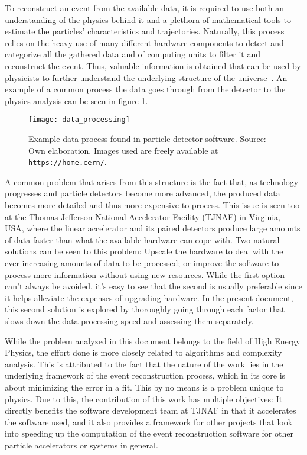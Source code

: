 To reconstruct an event from the available data, it is required to use both an understanding of the physics behind it and a plethora of mathematical tools to estimate the particles' characteristics and trajectories.
Naturally, this process relies on the heavy use of many different hardware components to detect and categorize all the gathered data and of computing units to filter it and reconstruct the event.
Thus, valuable information is obtained that can be used by physicists to further understand the underlying structure of the universe~\cite{sirunyan2017particle}.
An example of a common process the data goes through from the detector to the physics analysis can be seen in figure \ref{fig:data_processing}.

    \begin{figure}[ht]
        \centering
        \texttt{[image: data\_processing]}
        \caption{\label{fig:data_processing} Example data process found in particle detector software. Source: Own elaboration. Images used are freely available at \texttt{https://home.cern/}.}
    \end{figure}


A common problem that arises from this structure is the fact that, as technology progresses and particle detectors become more advanced, the produced data becomes more detailed and thus more expensive to process.
This issue is seen too at the Thomas Jefferson National Accelerator Facility (TJNAF) in Virginia, USA, where the linear accelerator and its paired detectors produce large amounts of data faster than what the available hardware can cope with. %
Two natural solutions can be seen to this problem: Upscale the hardware to deal with the ever-increasing amounts of data to be processed; or improve the software to process more information without using new resources.
While the first option can't always be avoided, it's easy to see that the second is usually preferable since it helps alleviate the expenses of upgrading hardware.
In the present document, this second solution is explored by thoroughly going through each factor that slows down the data processing speed and assessing them separately.


While the problem analyzed in this document belongs to the field of High Energy Physics, the effort done is more closely related to algorithms and complexity analysis.
This is attributed to the fact that the nature of the work lies in the underlying framework of the event reconstruction process, which in its core is about minimizing the error in a fit.
This by no means is a problem unique to physics.
Due to this, the contribution of this work has multiple objectives: It directly benefits the software development team at TJNAF in that it accelerates the software used, and it also provides a framework for other projects that look into speeding up the computation of the event reconstruction software for other particle accelerators or systems in general.

